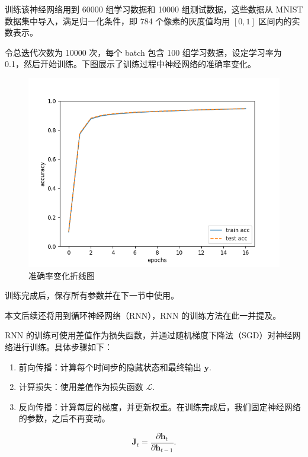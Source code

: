 训练该神经网络用到 60000 组学习数据和 10000 组测试数据，这些数据从 MNIST 数据集中导入，满足归一化条件，即 784 个像素的灰度值均用 $[0, 1]$ 区间内的实数表示。

令总迭代次数为 10000 次，每个 batch 包含 100 组学习数据，设定学习率为 0.1，然后开始训练。下图展示了训练过程中神经网络的准确率变化。

\begin{figure}[htbp]
  \centering
  \includegraphics[width=1\textwidth]{figures/output.png}
  \caption{准确率变化折线图}
  \label{fig:nn_lyapunov_exponents}
\end{figure}

训练完成后，保存所有参数并在下一节中使用。

本文后续还将用到循环神经网络（RNN），RNN 的训练方法在此一并提及。

RNN 的训练可使用差值作为损失函数，并通过随机梯度下降法（SGD）对神经网络进行训练。具体步骤如下：

\begin{enumerate}
  \item 前向传播：计算每个时间步的隐藏状态和最终输出 \(\mathbf{y}\).
  \item 计算损失：使用差值作为损失函数 \(\mathcal{L}\).
  \item 反向传播：计算每层的梯度，并更新权重。在训练完成后，我们固定神经网络的参数，之后不再变动。
\end{enumerate}

\begin{equation}
  \mathbf{J}_t = \frac{\partial \mathbf{h}_t}{\partial \mathbf{h}_{t-1}}.
\end{equation}

